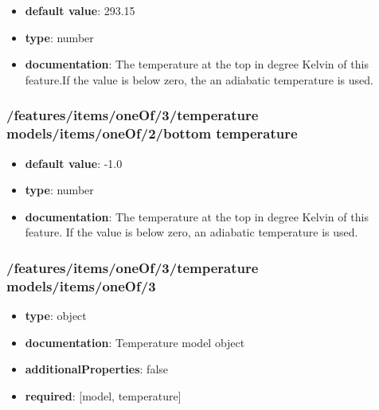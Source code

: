 \begin{itemize}\item {\bf default value}: 293.15
\item {\bf type}: number
\item {\bf documentation}: The temperature at the top in degree Kelvin of this feature.If the value is below zero, the an adiabatic temperature is used.
\end{itemize}\subsubsection{/features/items/oneOf/3/temperature models/items/oneOf/2/bottom temperature}
\begin{itemize}\item {\bf default value}: -1.0
\item {\bf type}: number
\item {\bf documentation}: The temperature at the top in degree Kelvin of this feature. If the value is below zero, an adiabatic temperature is used.
\end{itemize}\subsubsection{/features/items/oneOf/3/temperature models/items/oneOf/3}
\begin{itemize}\item {\bf type}: object
\item {\bf documentation}: Temperature model object
\item {\bf additionalProperties}: false
\item {\bf required}: [model, temperature]\end{itemize}
